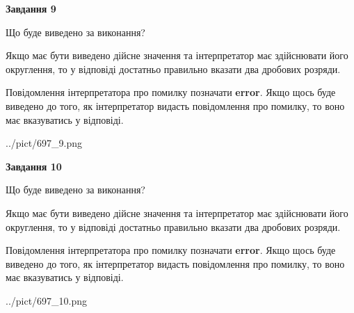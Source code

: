 \documentclass[12pt, ukrainian]{article}
\begin{document}
{\begin {Large}
{\begin {center}\textbf{Завдання 9}\end {center}}\par
Що буде виведено за виконання? \par

Якщо має бути виведено дійсне значення та інтерпретатор має здійснювати його округлення, 
то у відповіді достатньо правильно вказати два дробових розряди.

Повідомлення інтерпретатора про помилку позначати \textbf{error}.
Якщо щось буде виведено до того, як інтерпретатор видасть повідомлення про помилку, 
то воно має вказуватись у відповіді. \par

\begin{center}
	{../pict/697_9.png}
\end{center}
\newpage

{\begin {center}\textbf{Завдання 10}\end {center}}\par
Що буде виведено за виконання? \par

Якщо має бути виведено дійсне значення та інтерпретатор має здійснювати його округлення, 
то у відповіді достатньо правильно вказати два дробових розряди.

Повідомлення інтерпретатора про помилку позначати \textbf{error}.
Якщо щось буде виведено до того, як інтерпретатор видасть повідомлення про помилку, 
то воно має вказуватись у відповіді. \par

\begin{center}
	{../pict/697_10.png}
\end{center}
\newpage

\end {Large}}
\end{document}
